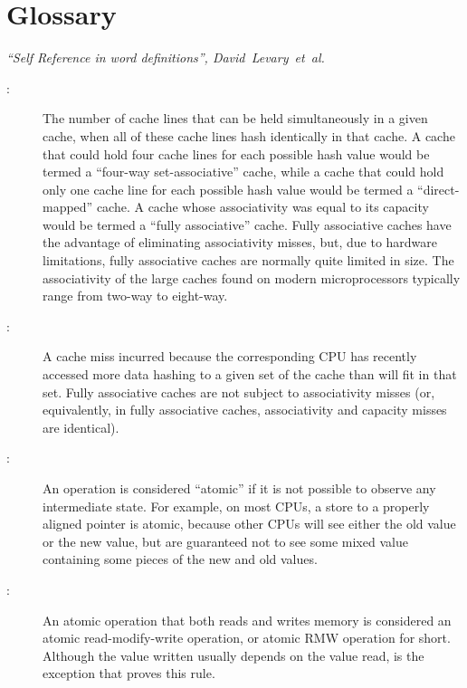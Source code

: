 
\chapter{Glossary}
%
	 {\emph{``Self Reference in word definitions'',
	        David~Levary~et~al.}}

\begin{description}
\item[:]
	The number of cache lines that can be held simultaneously in
	a given cache, when all of these cache lines hash identically
	in that cache.
	A cache that could hold four cache lines for each possible
	hash value would be termed a ``four-way set-associative'' cache,
	while a cache that could hold only one cache line for each
	possible hash value would be termed a ``direct-mapped'' cache.
	A cache whose associativity was equal to its capacity would
	be termed a ``fully associative'' cache.
	Fully associative caches have the advantage of eliminating
	associativity misses, but, due to hardware limitations,
	fully associative caches are normally quite limited in size.
	The associativity of the large caches found on modern microprocessors
	typically range from two-way to eight-way.
\item[:]
	A cache miss incurred because the corresponding CPU has recently
	accessed more data hashing to a given set of the cache than will
	fit in that set.
	Fully associative caches are not subject to associativity misses
	(or, equivalently, in fully associative caches, associativity
	and capacity misses are identical).
\item[:]
	An operation is considered ``atomic'' if it is not possible to
	observe any intermediate state.
	For example, on most CPUs, a store to a properly aligned pointer
	is atomic, because other CPUs will see either the old value or
	the new value, but are guaranteed not to see some mixed value
	containing some pieces of the new and old values.
\item[:]
	An atomic operation that both reads and writes memory is
	considered an atomic read-modify-write operation, or atomic RMW
	operation for short.
	Although the value written usually depends on the value read,
	 is the exception that proves this rule.

\end{description}

